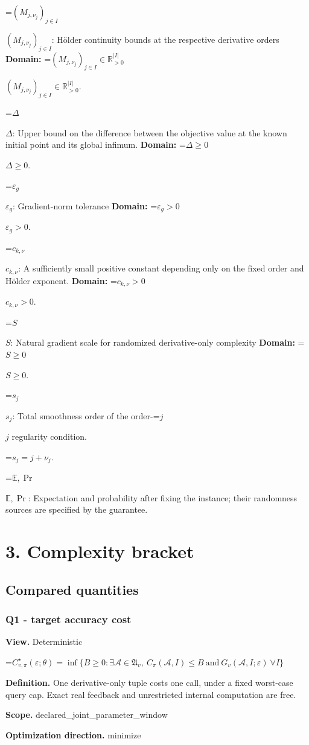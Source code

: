 \documentclass[10pt,a4paper]{article}
\newcommand{\AtlasMath}[1]{\par\begingroup\centering\setbox0=\hbox{$\displaystyle #1$}\ifdim\wd0>1.4\linewidth\typeout{ATLAS WIDE FORMULA: \the\wd0}\fi\ifdim\wd0>\linewidth\resizebox{\linewidth}{!}{\box0}\else\box0\fi\par\endgroup}
\newcommand{\AtlasInlineMath}[1]{\begingroup\setbox0=\hbox{$#1$}\ifdim\wd0>.4\linewidth\endgroup\AtlasMath{#1}\else\endgroup$#1$\fi}
\begin{document}
\AtlasInlineMath{(M_{j,\nu_j})_{j\in I}}: Hölder continuity bounds at the respective derivative orders \textbf{Domain:} \AtlasInlineMath{(M_{j,\nu_j})_{j\in I}\in\mathbb{R}_{>0}^{|I|}}.

\AtlasInlineMath{\Delta}: Upper bound on the difference between the objective value at the known initial point and its global infimum. \textbf{Domain:} \AtlasInlineMath{\Delta\ge0}.

\AtlasInlineMath{\varepsilon_g}: Gradient-norm tolerance \textbf{Domain:} \AtlasInlineMath{\varepsilon_g>0}.

\AtlasInlineMath{c_{k,\nu}}: A sufficiently small positive constant depending only on the fixed order and Hölder exponent. \textbf{Domain:} \AtlasInlineMath{c_{k,\nu}>0}.

\AtlasInlineMath{S}: Natural gradient scale for randomized derivative-only complexity \textbf{Domain:} \AtlasInlineMath{S\ge0}.

\AtlasInlineMath{s_j}: Total smoothness order of the order-\AtlasInlineMath{j} regularity condition.


\AtlasMath{s_j=j+\nu_j.}


\AtlasInlineMath{\mathbb{E},\Pr}: Expectation and probability after fixing the instance; their randomness sources are specified by the guarantee.

\section{3. Complexity bracket}
\subsection{Compared quantities}
\subsubsection{Q1 - target accuracy cost}
\textbf{View.} Deterministic

\AtlasMath{C^\star_{v,\pi}(\varepsilon;\theta)=\inf\{B\ge0:\exists\mathcal A\in\mathfrak A_v,\ C_\pi(\mathcal A,I)\le B\ \text{and}\ G_v(\mathcal A,I;\varepsilon)\ \forall I\}}
\textbf{Definition.} One derivative-only tuple costs one call, under a fixed worst-case query cap. Exact real feedback and unrestricted internal computation are free.

\textbf{Scope.} declared\_joint\_parameter\_window

\textbf{Optimization direction.} minimize
\end{document}
